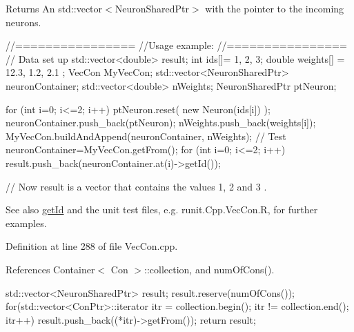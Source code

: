 \begin{DoxyReturn}{Returns}
An std::vector$<$NeuronSharedPtr$>$ with the pointer to the incoming neurons.
\end{DoxyReturn}

\begin{DoxyCode}
        //================
        //Usage example:
        //================
        // Data set up
                std::vector<double> result;
                int ids[]= {1, 2, 3};
                double weights[] = {12.3, 1.2, 2.1 };
                VecCon MyVecCon;
                std::vector<NeuronSharedPtr> neuronContainer;
                std::vector<double> nWeights;
                NeuronSharedPtr ptNeuron;

                        for (int i=0; i<=2; i++) {
                                ptNeuron.reset( new Neuron(ids[i]) );
                                neuronContainer.push_back(ptNeuron);
                                nWeights.push_back(weights[i]);
                        }
                        MyVecCon.buildAndAppend(neuronContainer, nWeights);
                // Test
                        neuronContainer=MyVecCon.getFrom();
                        for (int i=0; i<=2; i++) {
                                result.push_back(neuronContainer.at(i)->getId());
                        }

        // Now result is a vector that contains the values 1, 2 and 3 .
\end{DoxyCode}


\begin{DoxySeeAlso}{See also}
\hyperlink{classvec_con_aa9f3f5df4c4060951c975c4c829b8471}{getId} and the unit test files, e.g. runit.Cpp.VecCon.R, for further examples. 
\end{DoxySeeAlso}


Definition at line 288 of file VecCon.cpp.



References Container$<$ Con $>$::collection, and numOfCons().


\begin{DoxyCode}
                                                    {
        std::vector<NeuronSharedPtr> result;
        result.reserve(numOfCons());
        for(std::vector<ConPtr>::iterator itr = collection.begin();   itr != 
      collection.end();   itr++)   {
                result.push_back((*itr)->getFrom());
        }
        return result;
}
\end{DoxyCode}


